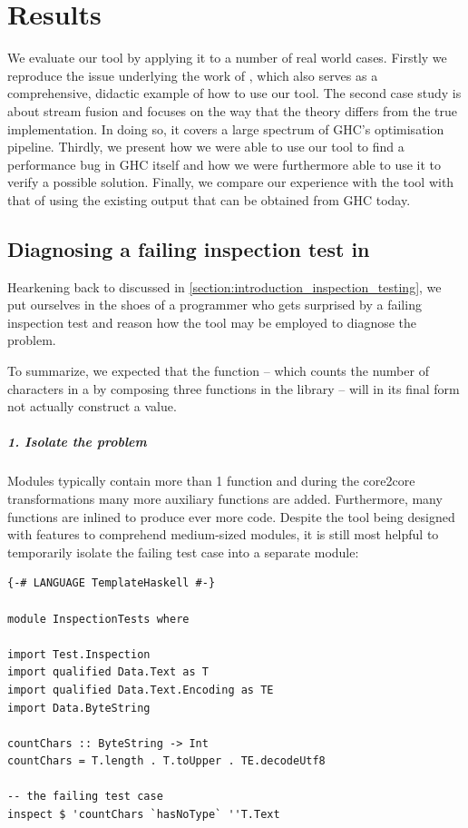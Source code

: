 \chapter{Results}

We evaluate our tool by applying it to a number of real world cases.
Firstly we reproduce the issue underlying the work of  \cite{inspection_testing}, which
also serves as a comprehensive, didactic example of how to use our tool.
The second case study is about stream fusion and focuses on the way that the theory differs from the true implementation.
In doing so, it covers a large spectrum of GHC's optimisation pipeline.
Thirdly, we present how we were able to use our tool to find a performance bug in GHC itself and how we were furthermore
able to use it to verify a possible solution.
Finally, we compare our experience with the tool with that of using the existing output that can
be obtained from GHC today.

\section{Diagnosing a failing inspection test in }

Hearkening back to  discussed in \cref{section:introduction_inspection_testing}, we put
ourselves in the shoes of a programmer who gets surprised by a failing inspection test and reason how the tool may
be employed to diagnose the problem. 

To summarize, we expected that the function  -- which counts the number of characters in a 
by composing three functions in the  library -- will in its final form not actually construct a  value.

\paragraph{1. Isolate the problem}
Modules typically contain more than 1 function and during the core2core transformations many more auxiliary functions are
added. Furthermore, many functions are inlined to produce ever more code. Despite the tool being designed with features to 
comprehend medium-sized modules, it is still most helpful to temporarily isolate the failing test case into a separate module:

\begin{verbatim}
{-# LANGUAGE TemplateHaskell #-}

module InspectionTests where

import Test.Inspection
import qualified Data.Text as T
import qualified Data.Text.Encoding as TE
import Data.ByteString

countChars :: ByteString -> Int
countChars = T.length . T.toUpper . TE.decodeUtf8

-- the failing test case
inspect $ 'countChars `hasNoType` ''T.Text
\end{verbatim}

